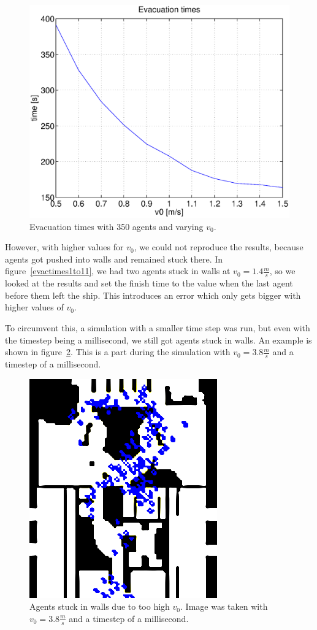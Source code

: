 \documentclass[11pt]{article}
\begin{document}
\begin{figure}[h]
	\centering
	\includegraphics[scale=0.5]{images/evactimes23to33.eps}
	\caption{Evacuation times with 350 agents and varying \(v_0\).}
	\label{evactimes23to33}
\end{figure}

However, with higher values for \(v_0\), we could not reproduce the results,
because agents got pushed into walls and remained stuck there. In
figure~\ref{evactimes1to11}, we had two agents stuck in walls at \(v_0 =
1.4\frac{m}{s}\), so we looked at the results and set the finish time to the
value when the last agent before them left the ship. This introduces an error
which only gets bigger with higher values of \(v_0\).

To circumvent this, a simulation with a smaller time step was run, but even
with the timestep being a millisecond, we still got agents stuck in walls. An
example is shown in figure~\ref{stuckinwall}. This is a part during the
simulation with \(v_0 = 3.8\frac{m}{s}\) and a timestep of a millisecond.

\begin{figure}[h]
	\centering
	\includegraphics[scale=1]{images/StuckInWall.png}
    \caption{Agents stuck in walls due to too high \(v_0\). Image was taken
    with \(v_0=3.8\frac{m}{s}\) and a timestep of a millisecond.}
	\label{stuckinwall}
\end{figure}
\end{document}
